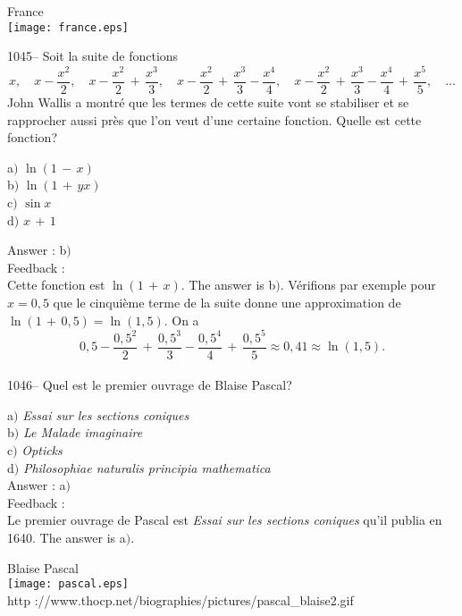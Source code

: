 ﻿\documentclass[letterpaper, 12pt]{article}
\begin{document}
        \begin{center}
        France\\
    \texttt{[image: france.eps]}\\
    \end{center}

1045-- Soit la suite de fonctions
$$\displaystyle{x,\quad x-\frac{x^2}2,\quad
x-\frac{x^2}2\,+\,\frac{x^3}3,\quad
x-\frac{x^2}2\,+\,\frac{x^3}3-\frac{x^4}4,\quad
x-\frac{x^2}2\,+\,\frac{x^3}3-\frac{x^4}4\,+\,\frac{x^5}5,\quad\ldots}$$
John Wallis a montr\'e que les termes de cette suite vont se
stabiliser et se rapprocher aussi pr\`es que l'on veut d'une
certaine fonction. Quelle est cette fonction?

a$)$ $\ln(1\,-\,x)$ \\
b$)$ $\ln(1\,+\,yx)$  \\
c$)$ $\sin x$  \\
d$)$ $x\,+\,1$

Answer : b$)$\\

Feedback : \\
Cette fonction est $\ln(1\,+\,x)$. The answer is b$)$.
V\'erifions par exemple pour $x=0,5$ que le cinqui\`eme terme de la
suite donne une approximation de $\ln(1\,+\,0,5)=\ln(1,5)$. On a
$$0,5-\frac{0,5^2}2\,+\,\frac{0,5^3}3-\frac{0,5^4}4\,+\,\frac{0,5^5}5\approx0,41\approx\ln(1,5).$$
\\

1046-- Quel est le premier ouvrage de Blaise Pascal?

a$)$ {\sl Essai sur les sections coniques} \\
b$)$ {\sl Le Malade imaginaire}  \\
c$)$ {\sl Opticks}  \\
d$)$ {\sl Philosophiae naturalis principia mathematica}\\

Answer : a$)$\\

Feedback : \\
Le premier ouvrage de Pascal est {\sl Essai sur les sections
coniques} qu'il publia en 1640. The answer is a$)$.

        \begin{center}
        Blaise Pascal\\
    \texttt{[image: pascal.eps]}\\
        {\footnotesize http
://www.thocp.net/biographies/pictures/pascal\_blaise2.gif}
    \end{center}
\end{document}

